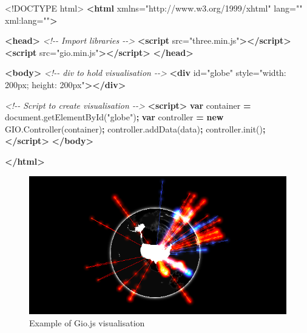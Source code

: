 \documentclass[
]{krantz}
\makeatletter
\newenvironment{Shaded}{\begin{snugshade}}{\end{snugshade}}
\newcommand{\AttributeTok}[1]{\textcolor[rgb]{0.61,0.61,0.61}{#1}}
\newcommand{\CommentTok}[1]{\textcolor[rgb]{0.37,0.37,0.37}{\textit{#1}}}
\newcommand{\DataTypeTok}[1]{\textcolor[rgb]{0.27,0.27,0.27}{#1}}
\newcommand{\KeywordTok}[1]{\textcolor[rgb]{0.27,0.27,0.27}{\textbf{#1}}}
\newcommand{\NormalTok}[1]{#1}
\newcommand{\OperatorTok}[1]{\textcolor[rgb]{0.43,0.43,0.43}{\textbf{#1}}}
\newcommand{\OtherTok}[1]{\textcolor[rgb]{0.37,0.37,0.37}{#1}}
\newcommand{\StringTok}[1]{\textcolor[rgb]{0.5,0.5,0.5}{#1}}
\newcommand{\VariableTok}[1]{\textcolor[rgb]{0,0,0}{#1}}
\newenvironment{kframe}{%
\medskip{}
\setlength{\fboxsep}{.8em}
 \def\at@end@of@kframe{}%
 \ifinner\ifhmode%
  \def\at@end@of@kframe{\end{minipage}}%
  \begin{minipage}{\columnwidth}%
 \fi\fi%
 \def\FrameCommand##1{\hskip\@totalleftmargin \hskip-\fboxsep
 \colorbox{shadecolor}{##1}\hskip-\fboxsep
     \hskip-\linewidth \hskip-\@totalleftmargin \hskip\columnwidth}%
 \MakeFramed {\advance\hsize-\width
   \@totalleftmargin\z@ \linewidth\hsize
   \@setminipage}}%
 {\par\unskip\endMakeFramed%
 \at@end@of@kframe}
\renewenvironment{Shaded}{\begin{kframe}}{\end{kframe}}
\makeatother
\begin{document}
\begin{Shaded}
\begin{Highlighting}[]
\DataTypeTok{<!DOCTYPE }\NormalTok{html}\DataTypeTok{>}
\KeywordTok{<html}\OtherTok{ xmlns=}\StringTok{"http://www.w3.org/1999/xhtml"}\OtherTok{ lang=}\StringTok{""}\OtherTok{ xml:lang=}\StringTok{""}\KeywordTok{>}

\KeywordTok{<head>}
  \CommentTok{<!{-}{-} Import libraries {-}{-}>}
  \KeywordTok{<script}\OtherTok{ src=}\StringTok{"three.min.js"}\KeywordTok{></script>}
  \KeywordTok{<script}\OtherTok{ src=}\StringTok{"gio.min.js"}\KeywordTok{></script>}
\KeywordTok{</head>}

\KeywordTok{<body>}
  \CommentTok{<!{-}{-} div to hold visualisation {-}{-}>}
  \KeywordTok{<div}\OtherTok{ id=}\StringTok{"globe"}\OtherTok{ style=}\StringTok{"width: 200px; height: 200px"}\KeywordTok{></div>}

  \CommentTok{<!{-}{-} Script to create visualisation {-}{-}>}
  \KeywordTok{<script>}
    \KeywordTok{var}\NormalTok{ container }\OperatorTok{=} \VariableTok{document}\NormalTok{.}\AttributeTok{getElementById}\NormalTok{(}\StringTok{"globe"}\NormalTok{)}\OperatorTok{;}
    \KeywordTok{var}\NormalTok{ controller }\OperatorTok{=} \KeywordTok{new} \VariableTok{GIO}\NormalTok{.}\AttributeTok{Controller}\NormalTok{(container)}\OperatorTok{;}
    \VariableTok{controller}\NormalTok{.}\AttributeTok{addData}\NormalTok{(data)}\OperatorTok{;}
    \VariableTok{controller}\NormalTok{.}\AttributeTok{init}\NormalTok{()}\OperatorTok{;}
  \KeywordTok{</script>}
\KeywordTok{</body>}

\KeywordTok{</html>}
\end{Highlighting}
\end{Shaded}

\begin{figure}
\centering
\includegraphics{images/gio-example.png}
\caption{Example of Gio.js visualisation}
\end{figure}
\end{document}
